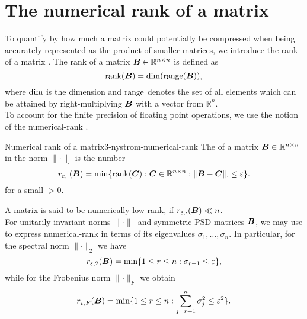 
\section{The numerical rank of a matrix}
\label{sec:3-nystrom-numerical-rank}

To quantify by how much a matrix could potentially be compressed when being accurately
represented as the product of smaller matrices, we introduce the rank of a
matrix \cite[section~III.3]{hefferon2012linear}.
The rank of a matrix $\boldsymbol{B} \in \mathbb{R}^{n \times n}$ is defined as
\begin{equation}
    \operatorname{rank}(\boldsymbol{B}) = \operatorname{dim}(\operatorname{range}(\boldsymbol{B})),
    \label{equ:3-nystrom-rank}
\end{equation}
where $\operatorname{dim}$ is the dimension and $\operatorname{range}$ denotes the set of all elements
which can be attained by right-multiplying $\boldsymbol{B}$ with a vector from $\mathbb{R}^n$.\\

To account for the finite precision of floating point operations, we use the
notion of the \gls{numerical-rank} \cite[definition~1.1]{noga2013rank}.
\begin{definition}{Numerical rank of a matrix}{3-nystrom-numerical-rank}
    The  of a matrix $\boldsymbol{B} \in \mathbb{R}^{n \times n}$
    in the norm $\lVert \cdot \rVert _{\cdot}$ is the number
    \begin{equation}
        r_{\varepsilon, \cdot}(\boldsymbol{B}) = \min \{\operatorname{rank}(\boldsymbol{C}): \boldsymbol{C} \in \mathbb{R}^{n \times n}: \lVert \boldsymbol{B} - \boldsymbol{C} \rVert _{\cdot} \leq \varepsilon \}.
        \label{equ:3-nystrom-def-numerical-rank}
    \end{equation}
    for a small  $> 0$.
\end{definition}%
A matrix is said to be numerically low-rank, if $r_{\varepsilon, \cdot}(\boldsymbol{B}) \ll n$.\\ 

For unitarily invariant norms $\lVert \cdot \rVert _{\cdot}$ and 
symmetric \gls{PSD} matrices $\boldsymbol{B}$, we may use
\cite[theorem~5]{mirsky1960truncation} to express \gls{numerical-rank} in terms
of its eigenvalues $\sigma_1, \dots, \sigma_n$.
In particular, for the spectral norm $\lVert \cdot \rVert _2$ we have
\begin{equation}
    r_{\varepsilon, 2}(\boldsymbol{B}) = \min \{1 \leq r \leq n: \sigma_{r+1} \leq \varepsilon \},
    \label{equ:3-nystrom-numerical-rank-spectral-norm}
\end{equation}
while for the Frobenius norm $\lVert \cdot \rVert _F$ we obtain
\begin{equation}
    r_{\varepsilon, F}(\boldsymbol{B}) = \min \{1 \leq r \leq n: \sum_{j=r+1}^n \sigma_{j}^2 \leq \varepsilon^2 \}.
    \label{equ:3-nystrom-numerical-rank-frobenius-norm}
\end{equation}\\


